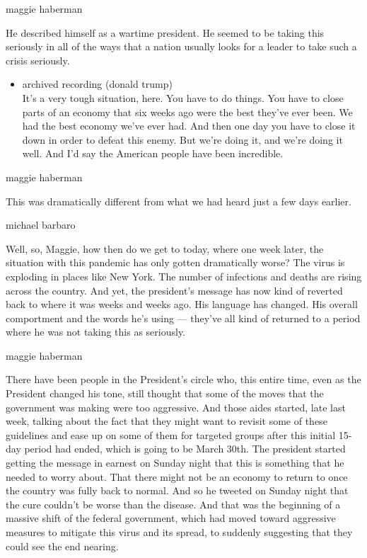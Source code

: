maggie haberman

He described himself as a wartime president. He seemed to be taking this
seriously in all of the ways that a nation usually looks for a leader to
take such a crisis seriously.

\begin{itemize}
\tightlist
\item
  archived recording (donald trump)\\
  It's a very tough situation, here. You have to do things. You have to
  close parts of an economy that six weeks ago were the best they've
  ever been. We had the best economy we've ever had. And then one day
  you have to close it down in order to defeat this enemy. But we're
  doing it, and we're doing it well. And I'd say the American people
  have been incredible.
\end{itemize}

maggie haberman

This was dramatically different from what we had heard just a few days
earlier.

michael barbaro

Well, so, Maggie, how then do we get to today, where one week later, the
situation with this pandemic has only gotten dramatically worse? The
virus is exploding in places like New York. The number of infections and
deaths are rising across the country. And yet, the president's message
has now kind of reverted back to where it was weeks and weeks ago. His
language has changed. His overall comportment and the words he's using
--- they've all kind of returned to a period where he was not taking
this as seriously.

maggie haberman

There have been people in the President's circle who, this entire time,
even as the President changed his tone, still thought that some of the
moves that the government was making were too aggressive. And those
aides started, late last week, talking about the fact that they might
want to revisit some of these guidelines and ease up on some of them for
targeted groups after this initial 15-day period had ended, which is
going to be March 30th. The president started getting the message in
earnest on Sunday night that this is something that he needed to worry
about. That there might not be an economy to return to once the country
was fully back to normal. And so he tweeted on Sunday night that the
cure couldn't be worse than the disease. And that was the beginning of a
massive shift of the federal government, which had moved toward
aggressive measures to mitigate this virus and its spread, to suddenly
suggesting that they could see the end nearing.

